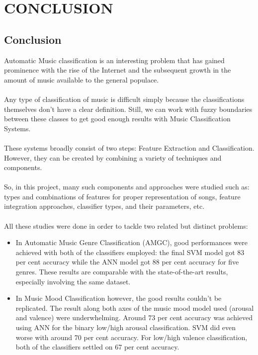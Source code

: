 \newpage

\section{CONCLUSION}
\subsection{Conclusion}
Automatic Music classification is an interesting problem that has gained prominence with the rise of the Internet and the subsequent growth in the amount of music available to the general populace.\\
\\
Any type of classification of music is difficult simply because the classifications themselves don’t have a clear definition. 
Still, we can work with fuzzy boundaries between these classes to get good enough results with Music Classification Systems.\\
\\
These systems broadly consist of two steps: Feature Extraction and Classification. However, they can be created by combining a variety of techniques and components.\\
\\
So, in this project, many such components and approaches were studied such as: types and combinations of features for 
proper representation of songs, feature integration approaches, classifier types, and their parameters, etc.\\
\\
All these studies were done in order to tackle two related but distinct problems: 
\begin{itemize}
        \item In Automatic Music Genre Classification (AMGC), good performances were achieved with both of the classifiers employed: the final SVM model got 83 per cent accuracy while the ANN model got 88 per cent accuracy for five genres. These results are comparable with the state-of-the-art results, especially involving the same dataset. 
        \item In Music Mood Classification however, the good results couldn’t be replicated. 
                The result along both axes of the music mood model used (arousal and valence) were underwhelming. Around 73 per cent accuracy was 
                achieved using ANN for the binary low/high arousal classification. SVM did even worse with around 70 per cent accuracy. 
                For low/high valence classification, both of the classifiers settled on 67 per cent accuracy.  
\end{itemize}

